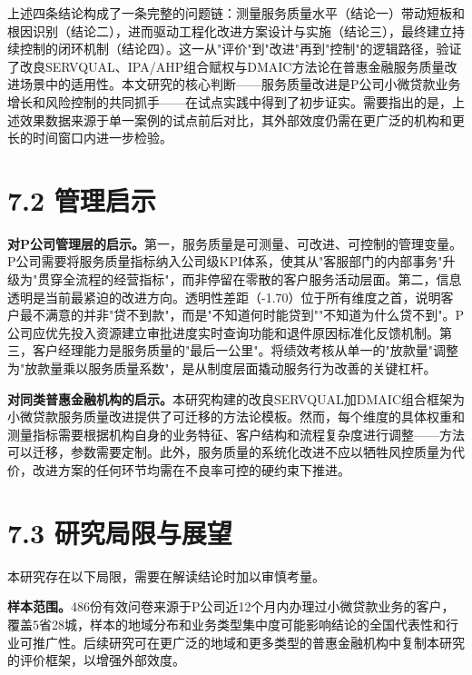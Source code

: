上述四条结论构成了一条完整的问题链：测量服务质量水平（结论一）带动短板和根因识别（结论二），进而驱动工程化改进方案设计与实施（结论三），最终建立持续控制的闭环机制（结论四）。这一从"评价"到"改进"再到"控制"的逻辑路径，验证了改良SERVQUAL、IPA/AHP组合赋权与DMAIC方法论在普惠金融服务质量改进场景中的适用性\cite{ref12}。本文研究的核心判断——服务质量改进是P公司小微贷款业务增长和风险控制的共同抓手——在试点实践中得到了初步证实。需要指出的是，上述效果数据来源于单一案例的试点前后对比，其外部效度仍需在更广泛的机构和更长的时间窗口内进一步检验。
\par

\section{7.2 管理启示}

\textbf{对P公司管理层的启示。}第一，服务质量是可测量、可改进、可控制的管理变量。P公司需要将服务质量指标纳入公司级KPI体系，使其从"客服部门的内部事务"升级为"贯穿全流程的经营指标"，而非停留在零散的客户服务活动层面。第二，信息透明是当前最紧迫的改进方向。透明性差距（-1.70）位于所有维度之首，说明客户最不满意的并非"贷不到款"，而是"不知道何时能贷到""不知道为什么贷不到"\cite{ref10}。P公司应优先投入资源建立审批进度实时查询功能和退件原因标准化反馈机制。第三，客户经理能力是服务质量的"最后一公里"。将绩效考核从单一的"放款量"调整为"放款量乘以服务质量系数"，是从制度层面撬动服务行为改善的关键杠杆。
\par

\textbf{对同类普惠金融机构的启示。}本研究构建的改良SERVQUAL加DMAIC组合框架为小微贷款服务质量改进提供了可迁移的方法论模板\cite{ref12,ref11}。然而，每个维度的具体权重和测量指标需要根据机构自身的业务特征、客户结构和流程复杂度进行调整——方法可以迁移，参数需要定制。此外，服务质量的系统化改进不应以牺牲风控质量为代价，改进方案的任何环节均需在不良率可控的硬约束下推进\cite{ref49}。
\par

\section{7.3 研究局限与展望}

本研究存在以下局限，需要在解读结论时加以审慎考量。
\par

\textbf{样本范围。}486份有效问卷来源于P公司近12个月内办理过小微贷款业务的客户，覆盖5省28城，样本的地域分布和业务类型集中度可能影响结论的全国代表性和行业可推广性。后续研究可在更广泛的地域和更多类型的普惠金融机构中复制本研究的评价框架，以增强外部效度。
\par

